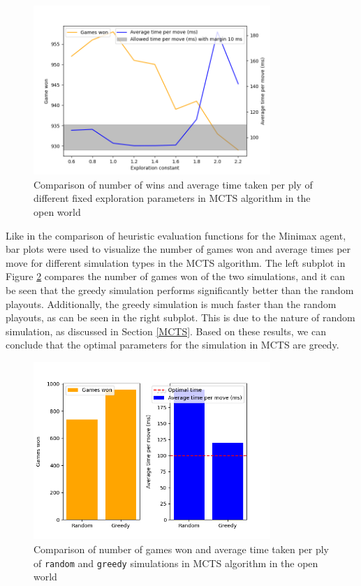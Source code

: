 \begin{figure}[h!]
  \centering
  \captionsetup{justification=centering}
  \includegraphics[width=0.8\textwidth]{../img/mcts_c_openworld.png}
  \caption{Comparison of number of wins and average time taken per ply of different fixed exploration parameters in MCTS algorithm in the open world}
  \label{mctsOWC}
\end{figure}

Like in the comparison of heuristic evaluation functions for the Minimax agent, bar plots were used to visualize the number of games won and average times per move for different simulation types in the MCTS algorithm. The left subplot in Figure \ref{mctsOWSimulations} compares the number of games won of the two simulations, and it can be seen that the greedy simulation performs significantly better than the random playouts. Additionally, the greedy simulation is much faster than the random playouts, as can be seen in the right subplot. This is due to the nature of random simulation, as discussed in Section \ref{MCTS}. Based on these results, we can conclude that the optimal parameters for the simulation in MCTS are greedy.

\begin{figure}[h]
  \centering
  \captionsetup{justification=centering}
  \includegraphics[width=0.8\textwidth]{../img/mcts_simulation_openworld.png}
  \caption{Comparison of number of games won and average time taken per ply of \texttt{random} and \texttt{greedy} simulations in MCTS algorithm in the open world}
  \label{mctsOWSimulations}
\end{figure}

